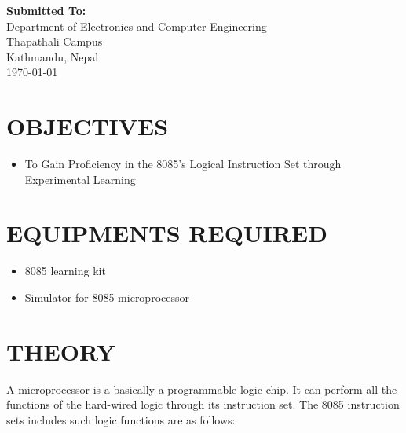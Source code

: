 \documentclass[]{report}
\begin{document}
\begin{titlepage}
\begin{center}
        \vspace{1cm}

        {\bfseries Submitted To:} \\
        Department of Electronics and Computer Engineering \\
        Thapathali Campus \\
        Kathmandu, Nepal \linebreak[5] \\
        \today \\
    \end{center}

\end{titlepage}

\section*{OBJECTIVES}
\begin{itemize}
 \item  To Gain Proficiency in the 8085's Logical Instruction Set through Experimental Learning
\end{itemize}

\section*{EQUIPMENTS REQUIRED}
\begin{itemize}
 \item 8085 learning kit
 \item Simulator for 8085 microprocessor
\end{itemize}

\section*{THEORY}
A microprocessor is a basically a programmable logic chip. It can perform all the functions of the hard-wired logic through its instruction set. The 8085 instruction sets includes such logic functions are as follows: \\
\end{document}
